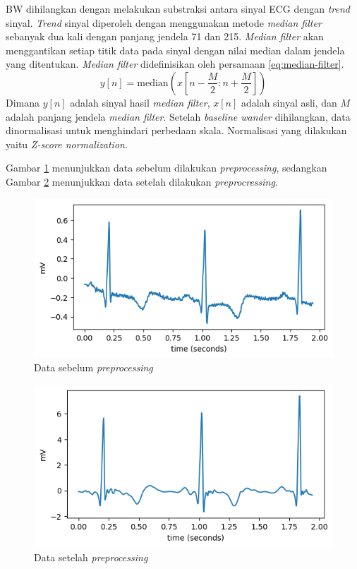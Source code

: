 BW dihilangkan dengan melakukan substraksi antara sinyal ECG dengan \textit{trend} sinyal.
\textit{Trend} sinyal diperoleh dengan menggunakan metode \textit{median filter} sebanyak dua kali dengan panjang jendela 71 dan 215.
\textit{Median filter} akan menggantikan setiap titik data pada sinyal dengan nilai median dalam jendela yang ditentukan.
\textit{Median filter} didefinisikan oleh persamaan \ref{eq:median-filter}.
\begin{equation}
    y[n] = \text{median}(x[n - \frac{M}{2} : n + \frac{M}{2}])
    \label{eq:median-filter}
\end{equation}
Dimana $y[n]$ adalah sinyal hasil \textit{median filter}, $x[n]$ adalah sinyal asli, dan $M$ adalah panjang jendela \textit{median filter}.
Setelah \textit{baseline wander} dihilangkan, data dinormalisasi untuk menghindari perbedaan skala.
Normalisasi yang dilakukan yaitu \textit{Z-score normalization}.

Gambar \ref{fig:sebelum-prep} menunjukkan data sebelum dilakukan \textit{preprocessing}, sedangkan Gambar \ref{fig:setelah-prep} menunjukkan data setelah dilakukan \textit{preprocressing}.

\begin{figure}[H]
    \centering
    \includegraphics[width=0.6\linewidth]{./img/sebelum_prep.png}
	\caption{Data sebelum \textit{preprocessing}}
	\label{fig:sebelum-prep}
\end{figure}

\begin{figure}[H]
  \centering
  \includegraphics[width=0.6\linewidth]{./img/setelah_prep.png}
  \caption{Data setelah \textit{preprocessing}}
  \label{fig:setelah-prep}
\end{figure}


